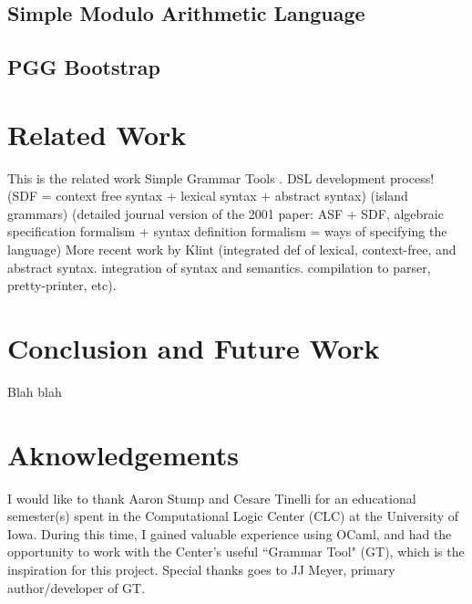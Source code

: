 \documentclass[10pt]{article}
\begin{document}
\subsection{Simple Modulo Arithmetic Language}
\subsection{PGG Bootstrap}

\section{Related Work}
This is the related work
Simple Grammar Tools
\cite{uiowa_gt} \cite{noonan_grammar}.
\cite{visser2008webdsl} DSL development process!
\cite{heering1989syntax} (SDF = context free syntax + lexical syntax + abstract syntax)
\cite{moonen2001generating} (island grammars)
\cite{klint1993meta} (detailed journal version of the 2001 paper: ASF + SDF, algebraic specification formalism + syntax definition formalism = ways of specifying the language)
\cite{klint2011easy} More recent work by Klint
\cite{van2001sf} (integrated def of lexical, context-free, and abstract syntax.  integration of syntax and semantics. compilation to parser, pretty-printer, etc).

\section{Conclusion and Future Work}
Blah blah

\section{Aknowledgements}
I would like to thank Aaron Stump and Cesare Tinelli for an educational
semester(s) spent in the Computational Logic Center (CLC) at the University of Iowa.
During this time, I gained valuable experience using OCaml, and had the opportunity
to work with the Center's useful ``Grammar Tool" (GT), which is the inspiration for this project.
Special thanks goes to JJ Meyer, primary author/developer of GT.



\end{document}
